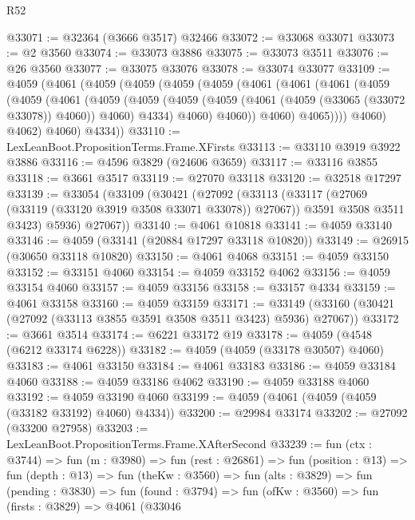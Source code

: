 \begin{lexlean}{R52}
\begin{coremodule}
@33071 := @32364 (@3666 @3517) @32466
@33072 := @33068 @33071
@33073 := @2 @3560
@33074 := @33073 @3886
@33075 := @33073 @3511
@33076 := @26 @3560
@33077 := @33075 @33076
@33078 := @33074 @33077
@33109 := @4059
    (@4061
      (@4059
        (@4059
          (@4059
            (@4059
              (@4061
                (@4061
                  (@4061
                    (@4059
                      (@4059
                        (@4061
                          (@4059
                            (@4059
                              (@4059
                                (@4059 (@4061 (@4059 (@33065 (@33072 @33078)) @4060)) @4060)
                                @4334)
                              @4060)
                            @4060))
                        @4060)
                      @4065))))
              @4060)
            @4062)
          @4060)
        @4334))
@33110 := LexLeanBoot.PropositionTerms.Frame.XFirsts
@33113 := @33110 @3919 @3922 @3886
@33116 := @4596 @3829 (@24606 @3659)
@33117 := @33116 @3855
@33118 := @3661 @3517
@33119 := @27070 @33118
@33120 := @32518 @17297
@33139 := @33054
    (@33109
      (@30421
        (@27092
          (@33113
            (@33117 (@27069 (@33119 (@33120 @3919 @3508 @33071 @33078)) @27067))
            @3591
            @3508
            @3511
            @3423)
          @5936)
        @27067))
@33140 := @4061 @10818
@33141 := @4059 @33140
@33146 := @4059 (@33141 (@20884 @17297 @33118 @10820))
@33149 := @26915 (@30650 @33118 @10820)
@33150 := @4061 @4068
@33151 := @4059 @33150
@33152 := @33151 @4060
@33154 := @4059 @33152 @4062
@33156 := @4059 @33154 @4060
@33157 := @4059 @33156
@33158 := @33157 @4334
@33159 := @4061 @33158
@33160 := @4059 @33159
@33171 := @33149 (@33160 (@30421 (@27092 (@33113 @3855 @3591 @3508 @3511 @3423) @5936) @27067))
@33172 := @3661 @3514
@33174 := @6221 @33172 @19
@33178 := @4059 (@4548 (@6212 @33174 @6228))
@33182 := @4059 (@4059 (@33178 @30507) @4060)
@33183 := @4061 @33150
@33184 := @4061 @33183
@33186 := @4059 @33184 @4060
@33188 := @4059 @33186 @4062
@33190 := @4059 @33188 @4060
@33192 := @4059 @33190 @4060
@33199 := @4059 (@4061 (@4059 (@4059 (@33182 @33192) @4060) @4334))
@33200 := @29984 @33174
@33202 := @27092 (@33200 @27958)
@33203 := LexLeanBoot.PropositionTerms.Frame.XAfterSecond
@33239 := fun (ctx : @3744) =>
  fun (m : @3980) =>
  fun (rest : @26861) =>
  fun (position : @13) =>
  fun (depth : @13) =>
  fun (theKw : @3560) =>
  fun (alts : @3829) =>
  fun (pending : @3830) =>
  fun (found : @3794) =>
  fun (ofKw : @3560) =>
  fun (firsts : @3829) =>
  @4061
    (@33046

\end{coremodule}
\end{lexlean}
